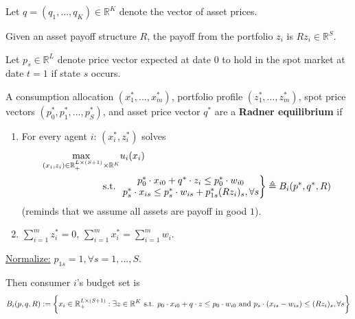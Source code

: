 \documentclass[11pt]{elegantbook}
\begin{document}
Let $q=(q_1,...,q_K)\in \mathbb{R}^K$ denote the vector of asset prices.

Given an asset payoff structure $R$, the payoff from the portfolio $z_i$ is $Rz_i\in \mathbb{R}^S$.

Let $p_s\in \mathbb{R}^L$ denote price vector expected at date $0$ to hold in the spot market at date $t=1$ if state $s$ occurs.

\begin{definition}
    \normalfont
    A consumption allocation $(x_1^*,...,x_m^*)$, portfolio profile $(z_1^*,...,z_m^*)$, spot price vectors $(p_0^*,p_1^*,...,p_S^*)$, and asset price vector $q^*$ are a \textbf{Radner equilibrium} if
    \begin{enumerate}
        \item For every agent $i$: $(x_i^*,z_i^*)$ solves
        \begin{equation}
            \begin{aligned}
                \max_{(x_i,z_i)\in \mathbb{R}^{L\times (S+1)}_+\times \mathbb{R}^K} &u_i(x_i)\\
                \textnormal{s.t. } &
                \left.\begin{matrix}
                p_0^*\cdot x_{i0}+q^*\cdot z_i\leq p_0^*\cdot w_{i0}\\
                p_s^*\cdot x_{is}\leq p_s^*\cdot w_{is}+p_{1s}^*(Rz_i)_s, \forall s
                \end{matrix}\right\}\triangleq B_i(p^*,q^*,R)
            \end{aligned}
            \nonumber
        \end{equation}
        (reminds that we assume all assets are payoff in good $1$).
        \item $\sum_{i=1}^mz_i^*=0$, $\sum_{i=1}^m x_i^*=\sum_{i=1}^m w_i$.
    \end{enumerate}
\end{definition}

\begin{note}
    \underline{Normalize:} $p_{1s}=1, \forall s=1,...,S$.
\end{note}
Then consumer $i$'s budget set is
\begin{equation}
    \begin{aligned}
        B_i(p,q,R):=\bigg\{x_i\in \mathbb{R}^{L\times (S+1)}_+:\exists z\in \mathbb{R}^K\textnormal{ s.t. }p_0\cdot x_{i0}+q\cdot z\leq p_0\cdot w_{i0}
        \textnormal{ and }p_s\cdot(x_{is}-w_{is})\leq (Rz_i)_s, \forall s\bigg\}
    \end{aligned}
    \nonumber
\end{equation}
\end{document}
